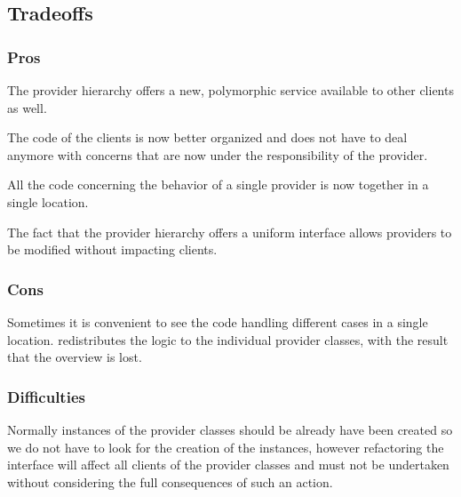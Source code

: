 \documentclass[a4paper,10pt,twoside]{book}
\begin{document}
\subsection*{Tradeoffs}

\subsubsection*{Pros}

\begin{bulletlist}
\item The provider hierarchy offers a new, polymorphic service available to other clients as well.

\item The code of the clients is now better organized and does not have to deal anymore with concerns that are now under the responsibility of the provider.

\item All the code concerning the behavior of a single provider is now together in a single location.

\item The fact that the provider hierarchy offers a uniform interface allows providers to be modified without impacting clients. 
\end{bulletlist}

\subsubsection*{Cons}

\begin{bulletlist}
\item Sometimes it is convenient to see the code handling different cases in a single location.  redistributes the logic to the individual provider classes, with the result that the overview is lost.
\end{bulletlist}

\subsubsection*{Difficulties}

\begin{bulletlist}
\item Normally instances of the provider classes should be already have been created so we do not have to look for the creation of the instances, however refactoring the interface will affect all clients of the provider classes and must not be undertaken without considering the full consequences of such an action.
\end{bulletlist}
\end{document}

